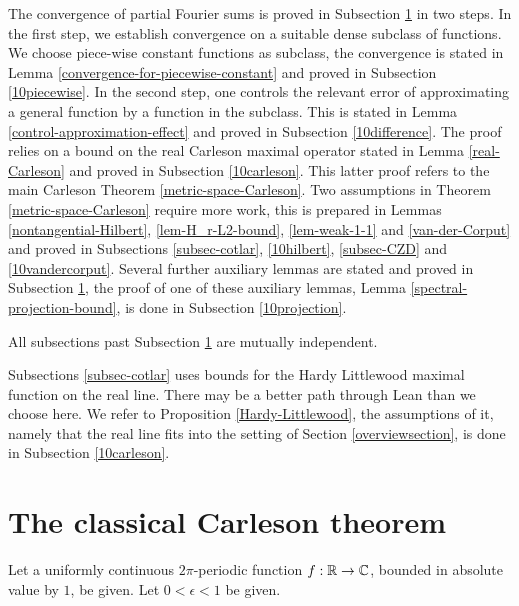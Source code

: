 {The convergence of partial Fourier sums is proved in
Subsection \ref{10classical} in two steps. In the first step,
we establish convergence on a suitable dense subclass of functions. We choose piece-wise constant functions as subclass, the convergence is stated in Lemma \ref{convergence-for-piecewise-constant} and proved in Subsection \ref{10piecewise}.
In the second step, one controls the relevant error of approximating a general function by a function in
the subclass. This is stated in Lemma \ref{control-approximation-effect} and proved
in Subsection \ref{10difference}.
The proof relies on a bound on the real Carleson maximal operator stated in Lemma \ref{real-Carleson} and proved in Subsection \ref{10carleson}.
This latter proof refers to the main Carleson Theorem \ref{metric-space-Carleson}. Two assumptions in Theorem \ref{metric-space-Carleson} require more work, this is prepared in Lemmas \ref{nontangential-Hilbert},
\ref{lem-H_r-L2-bound}, \ref{lem-weak-1-1} and \ref{van-der-Corput} and proved in Subsections \ref{subsec-cotlar},
\ref{10hilbert}, \ref{subsec-CZD}
and \ref{10vandercorput}.
Several further auxiliary lemmas are stated
and proved in Subsection
\ref{10classical}, the proof of one of these auxiliary lemmas, Lemma \ref{spectral-projection-bound}, is done in Subsection \ref{10projection}.
 

All subsections past Subsection \ref{10classical} are mutually independent.

 Subsections \ref{subsec-cotlar} uses bounds for the Hardy Littlewood maximal function on the real line. There may be a better path through Lean than we choose here.
 We refer to Proposition \ref{Hardy-Littlewood}, the assumptions of it,
 namely that the real line fits into the setting of Section \ref{overviewsection},
 is done in Subsection \ref{10carleson}.



\section{The classical Carleson theorem}
\label{10classical}

Let a uniformly continuous $2\pi$-periodic function $f:{\mathbb{R}}\to \mathbb{C}$, bounded in absolute value by $1$, be given. Let $0<\epsilon<1$ be given.

}
